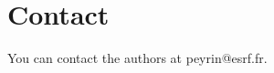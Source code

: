 \documentclass{InsightArticle}
\begin{document}
\section{Contact}

You can contact the authors at peyrin@esrf.fr.


%
%



\end{document}
